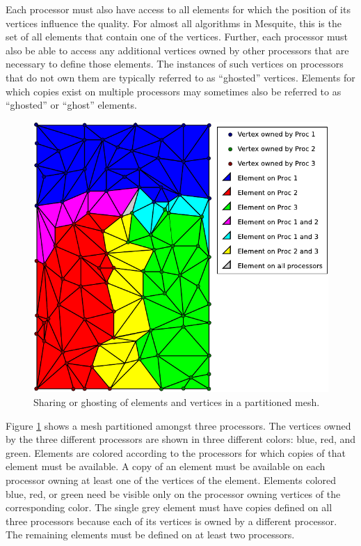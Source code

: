 Each processor must also have access to all elements for which the position of its vertices influence the quality.  For almost all algorithms in Mesquite, this is the set of all elements that contain one of the vertices.  Further, each processor must also be able to access any additional vertices owned by other processors that are necessary to define those elements.  The instances of such vertices on processors that do not own them are typically referred to as ``ghosted'' vertices.  Elements for which copies exist on multiple processors may sometimes also be referred to as ``ghosted'' or ``ghost'' elements.

\begin{figure}[htbp]
\begin{center}
    \includegraphics{figures/parallel_mesh}
    \caption{Sharing or ghosting of elements and vertices in a partitioned mesh.}
    \label{fig:parallel_mesh}
\end{center}
\end{figure}

Figure \ref{fig:parallel_mesh} shows a mesh partitioned amongst three processors.  The vertices owned by the three different processors are shown in three different colors: blue, red, and green.  Elements are colored according to the processors for which copies of that element must be available.  A copy of an element must be available on each processor owning at least one of the vertices of the element.  Elements colored blue, red, or green need be visible only on the processor owning vertices of the corresponding color. The single grey element must have copies defined on all three processors because each of its vertices is owned by a different processor.  The remaining elements must be defined on at least two processors.


